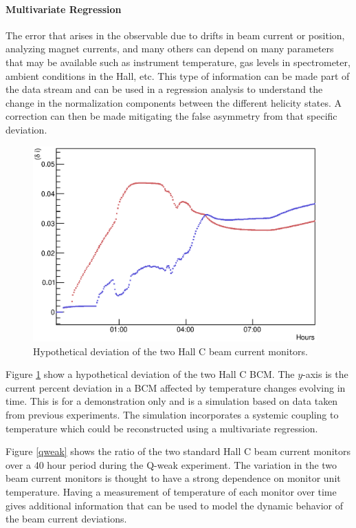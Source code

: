 \iffalse
\paragraph{Multivariate Regression}\mbox{}
\label{regress}

The error that arises in the observable due to drifts in beam current or position, analyzing magnet currents,
and many others can depend on many parameters that may be available such as instrument temperature, gas levels in spectrometer,
ambient conditions in the Hall, etc.  This type of information can be made part of the data stream and can be used in a regression
analysis to understand the change in the normalization components between the different helicity states.  A correction can then
be made mitigating the false asymmetry from that specific deviation.
\begin{figure}
\begin{center}
\includegraphics[height=75mm, angle=0]{./figs/dev}
\end{center}
\caption{Hypothetical deviation of the two Hall C beam current monitors.}
\label{dev}
\end{figure}
Figure \ref{dev} show a hypothetical deviation of the two Hall C BCM.  The $y$-axis is the current percent deviation in a BCM affected by temperature changes
evolving in time.  This is for a demonstration only and is a simulation based on
data taken from previous experiments.  The simulation incorporates a systemic coupling
to temperature which could be reconstructed using a multivariate regression.

Figure \ref{qweak} shows the ratio of the two standard Hall C beam current monitors over a 40 hour period during the Q-weak experiment.  The
variation in the two beam current monitors is thought to have a strong dependence on monitor unit temperature.  Having a measurement of temperature of each
monitor over time gives additional information that can be used to model the dynamic behavior of the beam current deviations.  

